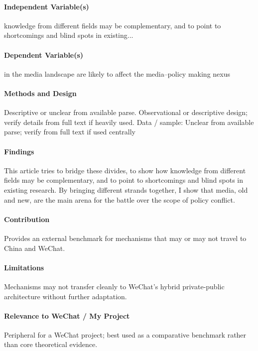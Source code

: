 \documentclass[12pt]{article}
\begin{document}
\paragraph{Independent Variable(s)} knowledge from different fields may be complementary, and to point to shortcomings and blind spots in existing...

\paragraph{Dependent Variable(s)} in the media landscape are likely to affect the media--policy making nexus

\paragraph{Methods and Design} Descriptive or unclear from available parse. Observational or descriptive design; verify details from full text if heavily used. Data / sample: Unclear from available parse; verify from full text if used centrally

\paragraph{Findings} This article tries to bridge these divides, to show how knowledge from different fields may be complementary, and to point to shortcomings and blind spots in existing research. By bringing different strands together, I show that media, old and new, are the main arena for the battle over the scope of policy conflict.

\paragraph{Contribution} Provides an external benchmark for mechanisms that may or may not travel to China and WeChat.

\paragraph{Limitations} Mechanisms may not transfer cleanly to WeChat's hybrid private-public architecture without further adaptation.

\paragraph{Relevance to WeChat / My Project} Peripheral for a WeChat project; best used as a comparative benchmark rather than core theoretical evidence.
\end{document}
